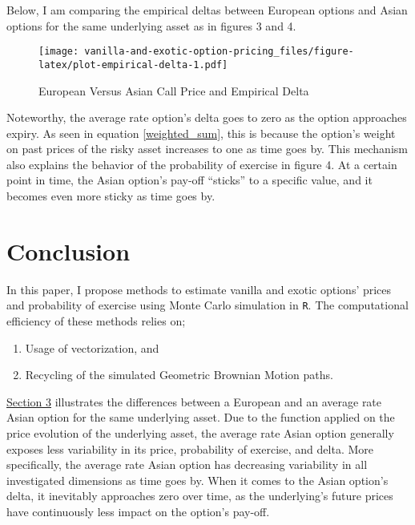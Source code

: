 \documentclass[
  12pt,
]{article}
\providecommand{\tightlist}{%
  \setlength{\itemsep}{0pt}\setlength{\parskip}{0pt}}
\begin{document}
Below, I am comparing the empirical deltas between European options and
Asian options for the same underlying asset as in figures 3 and 4.

\begin{figure}
\centering
\texttt{[image: vanilla-and-exotic-option-pricing\_files/figure-latex/plot-empirical-delta-1.pdf]}
\caption{European Versus Asian Call Price and Empirical Delta}
\end{figure}

Noteworthy, the average rate option's delta goes to zero as the option
approaches expiry. As seen in equation \eqref{weighted_sum}, this is
because the option's weight on past prices of the risky asset increases
to one as time goes by. This mechanism also explains the behavior of the
probability of exercise in figure 4. At a certain point in time, the
Asian option's pay-off \enquote{sticks} to a specific value, and it
becomes even more sticky as time goes by.

\hypertarget{conclusion}{%
\section{Conclusion}\label{conclusion}}

In this paper, I propose methods to estimate vanilla and exotic options'
prices and probability of exercise using Monte Carlo simulation in
\texttt{R}. The computational efficiency of these methods relies on;

\begin{enumerate}
\def\labelenumi{\arabic{enumi}.}
\tightlist
\item
  Usage of vectorization, and
\item
  Recycling of the simulated Geometric Brownian Motion paths.
\end{enumerate}

\protect\hyperlink{application-asian-options-price-probability-of-exercise-and-empirical-delta-for-a-risky-asset}{Section
3} illustrates the differences between a European and an average rate
Asian option for the same underlying asset. Due to the function applied
on the price evolution of the underlying asset, the average rate Asian
option generally exposes less variability in its price, probability of
exercise, and delta. More specifically, the average rate Asian option
has decreasing variability in all investigated dimensions as time goes
by. When it comes to the Asian option's delta, it inevitably approaches
zero over time, as the underlying's future prices have continuously less
impact on the option's pay-off.
\end{document}
